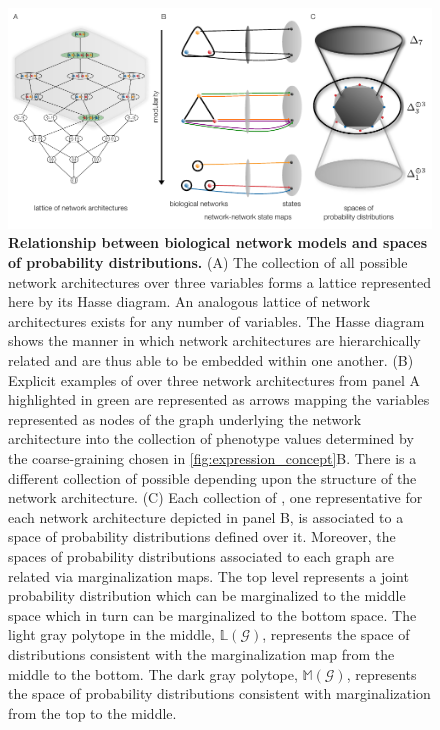 \begin{figure}[!ht]
\label{fig:inconsistentthreecycle}
\end{figure}

\begin{figure}[!ht]
\centering
\noindent\includegraphics[width=0.9\columnwidth]{fig/conediagram.pdf}
\caption{{\bf Relationship between biological network models and spaces of probability distributions.} (A) The collection of all possible network architectures over three variables forms a lattice represented here by its Hasse diagram. An analogous lattice of network architectures exists for any number of variables. The Hasse diagram shows the manner in which network architectures are hierarchically related and are thus able to be embedded within one another. (B) Explicit examples of \gnpm{} over three network architectures from panel A highlighted in green are represented as arrows mapping the variables represented as nodes of the graph underlying the network architecture into the collection of phenotype values determined by the coarse-graining chosen in \ref{fig:expression_concept}B. There is a different collection of possible \gnpm{} depending upon the structure of the network architecture. (C) Each collection of \gnpm{}, one representative for each network architecture depicted in panel B, is associated to a space of probability distributions defined over it. Moreover, the spaces of probability distributions associated to each graph are related via marginalization maps. The top level represents a joint probability distribution which can be marginalized to the middle space which in turn can be marginalized to the bottom space. The light gray polytope in the middle, $\mathbb{L}(\mathcal{G})$, represents the space of distributions consistent with the marginalization map from the middle to the bottom. The dark gray polytope, $\mathbb{M}(\mathcal{G})$, represents the space of probability distributions consistent with marginalization from the top to the middle.}
\label{fig:conediagram}
\end{figure}

